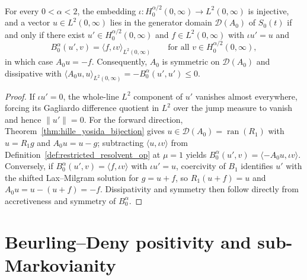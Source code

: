 \begin{theorem}\label{thm:restricted_generator_weak_form}
\leanok
For every $0 < \alpha < 2$, the embedding $\iota : H^{\alpha/2}_0(0,\infty) \to L^2(0,\infty)$ is injective, and a vector $u \in L^2(0,\infty)$ lies in the generator domain $\mathcal{D}(A_0)$ of $S_0(t)$ if and only if there exist $u' \in H^{\alpha/2}_0(0,\infty)$ and $f \in L^2(0,\infty)$ with $\iota u' = u$ and
\[
  B^\alpha_0(u', v) = \langle f, \iota v \rangle_{L^2(0,\infty)} \qquad \text{for all } v \in H^{\alpha/2}_0(0,\infty),
\]
in which case $A_0 u = -f$. Consequently, $A_0$ is symmetric on $\mathcal{D}(A_0)$ and dissipative with $\langle A_0 u, u \rangle_{L^2(0,\infty)} = -B^\alpha_0(u', u') \le 0$.
\end{theorem}

\begin{proof}
\leanok
If $\iota u' = 0$, the whole-line $L^2$ component of $u'$ vanishes almost everywhere, forcing its Gagliardo difference quotient in $L^2$ over the jump measure to vanish and hence $\lVert u' \rVert = 0$. For the forward direction, Theorem~\ref{thm:hille_yosida_bijection} gives $u \in \mathcal{D}(A_0) = \operatorname{ran}(R_1)$ with $u = R_1 g$ and $A_0 u = u - g$; subtracting $\langle u, \iota v \rangle$ from Definition~\ref{def:restricted_resolvent_op} at $\mu = 1$ yields $B^\alpha_0(u', v) = \langle -A_0 u, \iota v \rangle$. Conversely, if $B^\alpha_0(u', v) = \langle f, \iota v \rangle$ with $\iota u' = u$, coercivity of $B_1$ identifies $u'$ with the shifted Lax--Milgram solution for $g = u + f$, so $R_1(u + f) = u$ and $A_0 u = u - (u + f) = -f$. Dissipativity and symmetry then follow directly from accretiveness and symmetry of $B^\alpha_0$.
\end{proof}

\section{Beurling--Deny positivity and sub-Markovianity}

